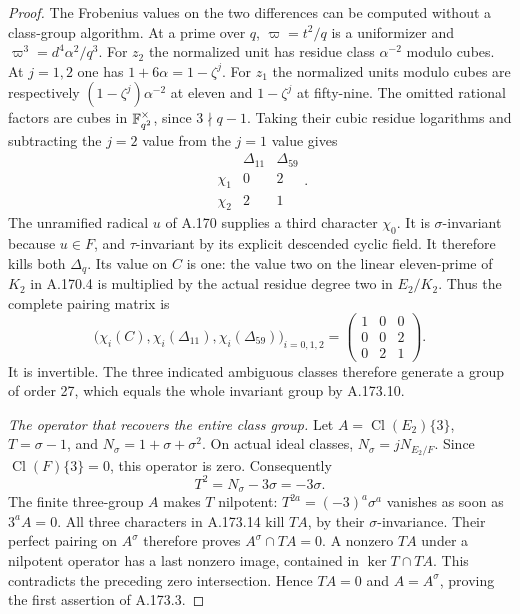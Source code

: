 \begin{proof}
The Frobenius values on the two differences can be computed
without a class-group algorithm.  At a prime over \(q\),
\(\varpi=t^2/q\) is a uniformizer and
\(\varpi^3=d^4\alpha^2/q^3\).  For \(z_2\) the normalized
unit has residue class \(\alpha^{-2}\) modulo cubes.
At \(j=1,2\) one has \(1+6\alpha=1-\zeta^j\).
For \(z_1\) the normalized units modulo cubes are respectively
\((1-\zeta^j)\alpha^{-2}\) at eleven and
\(1-\zeta^j\) at fifty-nine.  The omitted rational factors
are cubes in \(\mathbb F_{q^2}^\times\), since \(3\nmid q-1\).
Taking their cubic residue logarithms and subtracting the
\(j=2\) value from the \(j=1\) value gives
\[
 \begin{array}{c|rr}
       &\Delta_{11}&\Delta_{59}\\ \hline
 \chi_1&0&2\\
 \chi_2&2&1
 \end{array}.
\tag{A.173.13}
\]
The unramified radical \(u\) of A.170 supplies a third character
\(\chi_0\).  It is \(\sigma\)-invariant because \(u\in F\),
and \(\tau\)-invariant by its explicit descended cyclic field.
It therefore kills both \(\Delta_q\).  Its value on \(C\)
is one: the value two on the linear eleven-prime of \(K_2\)
in A.170.4 is multiplied by the actual residue degree two
in \(E_2/K_2\).  Thus the complete pairing matrix is
\[
 \bigl(\chi_i(C),\chi_i(\Delta_{11}),\chi_i(\Delta_{59})\bigr)_{i=0,1,2}
   =\begin{pmatrix}1&0&0\\0&0&2\\0&2&1\end{pmatrix}.
\tag{A.173.14}
\]
It is invertible.  The three indicated ambiguous classes
therefore generate a group of order 27, which equals the
whole invariant group by A.173.10.

\emph{The operator that recovers the entire class group.}
Let \(A=\operatorname{Cl}(E_2)\{3\}\), \(T=\sigma-1\), and
\(N_\sigma=1+\sigma+\sigma^2\).  On actual ideal classes,
\(N_\sigma=jN_{E_2/F}\).  Since
\(\operatorname{Cl}(F)\{3\}=0\), this operator is zero.
Consequently
\[
                       T^2=N_\sigma-3\sigma=-3\sigma.
\tag{A.173.15}
\]
The finite three-group \(A\) makes \(T\) nilpotent:
\(T^{2a}=(-3)^a\sigma^a\) vanishes as soon as \(3^a A=0\).
All three characters in A.173.14 kill \(TA\), by their
\(\sigma\)-invariance.  Their perfect pairing on \(A^\sigma\)
therefore proves \(A^\sigma\cap TA=0\).
A nonzero \(TA\) under a nilpotent operator has a last nonzero
image, contained in \(\ker T\cap TA\).  This contradicts
the preceding zero intersection.  Hence \(TA=0\) and
\(A=A^\sigma\), proving the first assertion of A.173.3.


\end{proof}
